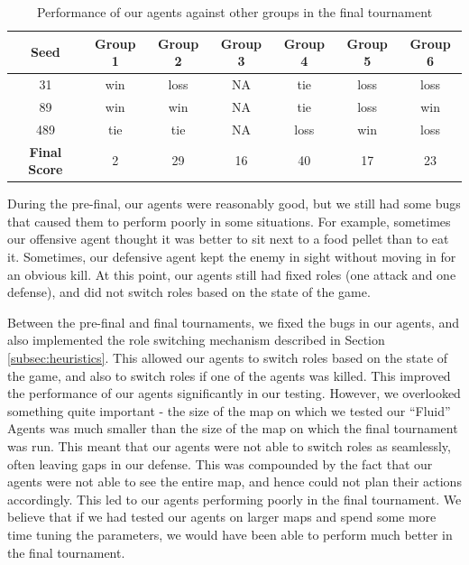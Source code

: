 \documentclass[a4paper,12pt]{article}
\begin{document}


\begin{table}[!hptb]
  \centering
  \begin{tabular}{|c|c|c|c|c|c|c|}
    \hline
    \textbf{Seed} & \textbf{Group 1} & \textbf{Group 2} & \textbf{Group 3} & \textbf{Group 4} & \textbf{Group 5} & \textbf{Group 6} \\
    \hline
    31 & win & loss & NA & tie & loss & loss \\
    \hline
    89 & win & win & NA & tie & loss & win \\
    \hline
    489 & tie & tie & NA & loss & win & loss \\
    \hline
    \textbf{Final Score} & 2 & 29 & 16 & 40 & 17 & 23 \\
    \hline

  \end{tabular}
  \caption{Performance of our agents against other groups in the final tournament}
  \label{tab:results_final}
\end{table}

During the pre-final, our agents were reasonably good, but we still had some bugs that caused them to perform poorly in some situations. For example, sometimes our offensive agent thought it was better to sit next to a food pellet than to eat it. Sometimes, our defensive agent kept the enemy in sight without moving in for an obvious kill. At this point, our agents still had fixed roles (one attack and one defense), and did not switch roles based on the state of the game.

Between the pre-final and final tournaments, we fixed the bugs in our agents, and also implemented the role switching mechanism described in Section \ref{subsec:heuristics}. This allowed our agents to switch roles based on the state of the game, and also to switch roles if one of the agents was killed. This improved the performance of our agents significantly in our testing. However, we overlooked something quite important - the size of the map on which we tested our ``Fluid'' Agents was much smaller than the size of the map on which the final tournament was run. This meant that our agents were not able to switch roles as seamlessly, often leaving gaps in our defense. This was compounded by the fact that our agents were not able to see the entire map, and hence could not plan their actions accordingly. This led to our agents performing poorly in the final tournament. We believe that if we had tested our agents on larger maps and spend some more time tuning the parameters, we would have been able to perform much better in the final tournament.
\end{document}

